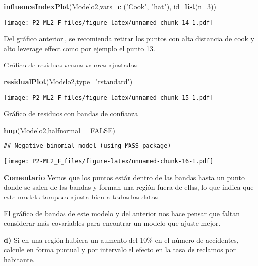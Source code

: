 \documentclass[]{article}
\newenvironment{Shaded}{\begin{snugshade}}{\end{snugshade}}
\newcommand{\DataTypeTok}[1]{\textcolor[rgb]{0.13,0.29,0.53}{#1}}
\newcommand{\DecValTok}[1]{\textcolor[rgb]{0.00,0.00,0.81}{#1}}
\newcommand{\KeywordTok}[1]{\textcolor[rgb]{0.13,0.29,0.53}{\textbf{#1}}}
\newcommand{\NormalTok}[1]{#1}
\newcommand{\OtherTok}[1]{\textcolor[rgb]{0.56,0.35,0.01}{#1}}
\newcommand{\StringTok}[1]{\textcolor[rgb]{0.31,0.60,0.02}{#1}}
\begin{document}
\begin{Shaded}
\begin{Highlighting}[]
\KeywordTok{influenceIndexPlot}\NormalTok{(Modelo2,}\DataTypeTok{vars=}\KeywordTok{c}\NormalTok{ (}\StringTok{"Cook"}\NormalTok{, }\StringTok{"hat"}\NormalTok{), }\DataTypeTok{id=}\KeywordTok{list}\NormalTok{(}\DataTypeTok{n=}\DecValTok{3}\NormalTok{))}
\end{Highlighting}
\end{Shaded}

\texttt{[image: P2-ML2\_F\_files/figure-latex/unnamed-chunk-14-1.pdf]}

Del gráfico anterior , se recomienda retirar los puntos con alta
distancia de cook y alto leverage effect como por ejemplo el punto 13.

Gráfico de residuos versus valores ajustados

\begin{Shaded}
\begin{Highlighting}[]
\KeywordTok{residualPlot}\NormalTok{(Modelo2,}\DataTypeTok{type=}\StringTok{"rstandard"}\NormalTok{)}
\end{Highlighting}
\end{Shaded}

\texttt{[image: P2-ML2\_F\_files/figure-latex/unnamed-chunk-15-1.pdf]}

Gráfico de residuos con bandas de confianza

\begin{Shaded}
\begin{Highlighting}[]
\KeywordTok{hnp}\NormalTok{(Modelo2,}\DataTypeTok{halfnormal =} \OtherTok{FALSE}\NormalTok{)}
\end{Highlighting}
\end{Shaded}

\begin{verbatim}
## Negative binomial model (using MASS package)
\end{verbatim}

\texttt{[image: P2-ML2\_F\_files/figure-latex/unnamed-chunk-16-1.pdf]}

\textbf{Comentario} Vemos que los puntos están dentro de las bandas
hasta un punto donde se salen de las bandas y forman una región fuera de
ellas, lo que indica que este modelo tampoco ajusta bien a todos los
datos.

El gráfico de bandas de este modelo y del anterior nos hace pensar que
faltan considerar más covariables para encontrar un modelo que ajuste
mejor.

\textbf{d)} Si en una región hubiera un aumento del 10\% en el número de
accidentes, calcule en forma puntual y por intervalo el efecto en la
tasa de reclamos por habitante.
\end{document}
